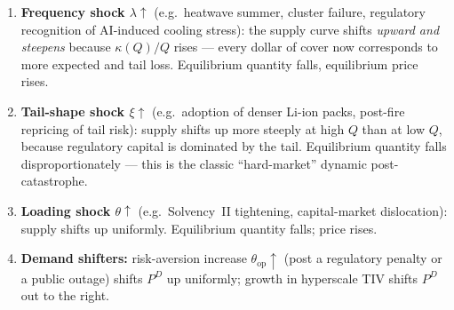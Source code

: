 \begin{enumerate}[leftmargin=*,nosep]
   \item \textbf{Frequency shock $\lambda\uparrow$} (e.g.\ heatwave
         summer, cluster failure, regulatory recognition of
         AI-induced cooling stress): the supply curve shifts
         \emph{upward and steepens} because $\kappa(Q)/Q$ rises ---
         every dollar of cover now corresponds to more expected and
         tail loss. Equilibrium quantity falls, equilibrium price rises.
   \item \textbf{Tail-shape shock $\xi\uparrow$} (e.g.\ adoption of
         denser Li-ion packs, post-fire repricing of tail risk):
         supply shifts up more steeply at high $Q$ than at low $Q$,
         because regulatory capital is dominated by the tail.
         Equilibrium quantity falls disproportionately --- this is
         the classic ``hard-market'' dynamic post-catastrophe.
   \item \textbf{Loading shock $\theta\uparrow$} (e.g.\ Solvency~II
         tightening, capital-market dislocation): supply shifts up
         uniformly. Equilibrium quantity falls; price rises.
   \item \textbf{Demand shifters:} risk-aversion increase
         $\theta_{\mathrm{op}}\uparrow$ (post a regulatory penalty or a
         public outage) shifts $P^D$ up uniformly; growth in
         hyperscale TIV shifts $P^D$ out to the right.
\end{enumerate}

